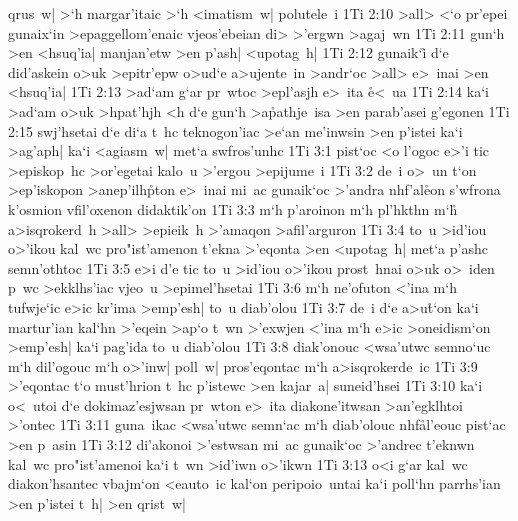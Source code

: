 qrus~w|
>`h
margar'itaic
>`h
<imatism~w|
polutele~i\bibvsend
\vs 1Ti 2:10
>all>
<`o
pr'epei
gunaix`in
>epaggellom'enaic
vjeos'ebeian
di>
>'ergwn
>agaj~wn\bibvsend
\vs 1Ti 2:11
gun`h
>en
<hsuq'ia|
manjan'etw
>en
p'ash|
<upotag~h|\bibvsend
\vs 1Ti 2:12
gunaik`i\r{}
d`e
did'askein
o>uk
>epitr'epw
o>ud`e
a>ujente~in
>andr`oc
>all>
e>~inai
>en
<hsuq'ia|\bibvsend
\vs 1Ti 2:13
>ad`am
g`ar
pr~wtoc
>epl'asjh
e>~ita
\r{e}<~ua\bibvsend
{}
\vs 1Ti 2:14
ka`i
>ad`am
o>uk
>hpat'hjh
<h
d`e
gun`h
>a\r{p}athje~isa
>en
parab'asei
g'egonen\bibvsend
\vs 1Ti 2:15
swj'hsetai
d`e
di`a
t~hc
teknogon'iac
>e`an
me'inwsin
>en
p'istei
ka`i
>ag'aph|
ka`i
<agiasm~w|
met`a
swfros'unhc\bibvsend
\vs 1Ti 3:1
pist`oc
<o
l'ogoc
e>'i
tic
>episkop~hc
>or'egetai
kalo~u
>'ergou
>epijume~i\bibvsend
\vs 1Ti 3:2
de~i
o>~un
t`on
>ep'iskopon
>anep'ilh\r{p}ton
e>~inai
mi~ac
gunaik`oc
>'andra
nhf'al\r{e}on
s'wfrona
k'osmion
vfil'oxenon
didaktik'on\bibvsend
\vs 1Ti 3:3
m`h
p'aroinon
m`h
pl'hkthn
m`h\r{}
a>isqrokerd~h
>all>
>epieik~h
>'amaqon
>afil'arguron\bibvsend
\vs 1Ti 3:4
to~u
>id'iou
o>'ikou
kal~wc
pro"ist'amenon
t'ekna
>'eqonta
>en
<upotag~h|
met`a
p'ashc
semn'othtoc\bibvsend
\vs 1Ti 3:5
e>i
d'e
tic
to~u
>id'iou
o>'ikou
prost~hnai
o>uk
o>~iden
p~wc
>ekklhs'iac
vjeo~u
>epimel'hsetai\bibvsend
\vs 1Ti 3:6
m`h
ne'ofuton
<'ina
m`h
tufwje`ic
e>ic
kr'ima
>emp'esh|
to~u
diab'olou\bibvsend
\vs 1Ti 3:7
de~i
d`e
a>u\r{t}`on
ka`i
martur'ian
kal`hn
>'eqein
>ap`o
t~wn
>'exwjen
<'ina
m`h
e>ic
>oneidism`on
>emp'esh|
ka`i
pag'ida
to~u
diab'olou\bibvsend
\vs 1Ti 3:8
diak'onouc
<wsa'utwc
semno`uc
m`h
dil'ogouc
m`h
o>'inw|
poll~w|
pros'eqontac
m`h
a>isqrokerde~ic\bibvsend
\vs 1Ti 3:9
>'eqontac
t`o
must'hrion
t~hc
p'istewc
>en
kajar~a|
suneid'hsei\bibvsend
\vs 1Ti 3:10
ka`i
o<~utoi
d`e
dokimaz'esjwsan
pr~wton
e>~ita
diakone'itwsan
>an'egklhtoi
>'ontec\bibvsend
\vs 1Ti 3:11
guna~ikac
<wsa'utwc
semn`ac
m`h
diab'olouc
nhf\r{a}l'eouc
pist`ac
>en
p~asin\bibvsend
\vs 1Ti 3:12
di'akonoi
>'estwsan
mi~ac
gunaik`oc
>'andrec
t'eknwn
kal~wc
pro"ist'amenoi
ka`i
t~wn
>id'iwn
o>'ikwn\bibvsend
\vs 1Ti 3:13
o<i
g`ar
kal~wc
diakon'hsantec
vbajm`on
<eauto~ic
kal`on
peripoio~untai
ka`i
poll`hn
parrhs'ian
>en
p'istei
t~h|
>en
qrist~w|

